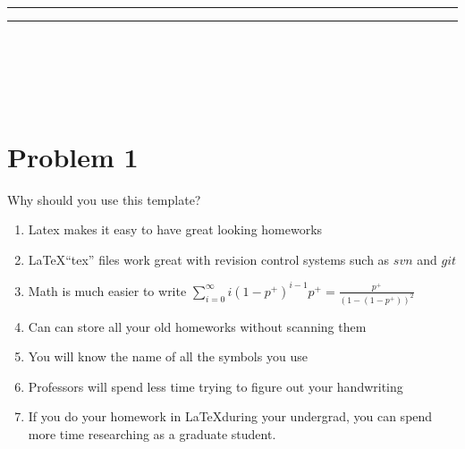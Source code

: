 \documentclass[12pt,letterpaper]{article}
\begin{document}
\begin{titlepage}
\begin{center}
\textsc{\LARGE \university}\vspace{10mm}
\hrule\vspace{2mm}
\huge\bfseries\thetitle\vspace{2mm}
\hrule\vspace{10mm}
\end{center}
\begin{flushleft}
\textbf\theauthor\\
\theclass\\
\studentid\\
\email\\
\end{flushleft}
\vfill
\begin{center}
\thedate
\end{center}
\end{titlepage}
\newpage



\section*{Problem 1}

Why should you use this template?

\begin{enumerate}
  \item Latex makes it easy to have great looking homeworks
  \item \LaTeX ``tex'' files work great with revision control systems such as
  $svn$ and $git$
  \item Math is much easier to write $\displaystyle\sum_{i=0}^\infty
  i(1-p^+)^{i-1}p^+ = \frac{p^+}{(1-(1-p^+))^2}$
  \item Can can store all your old homeworks without scanning them
  \item You will know the name of all the symbols you use
  \item Professors will spend less time trying to figure out your handwriting
  \item If you do your homework in \LaTeX during your undergrad, you can spend
  more time researching as a graduate student.
\end{enumerate}
\end{document}
